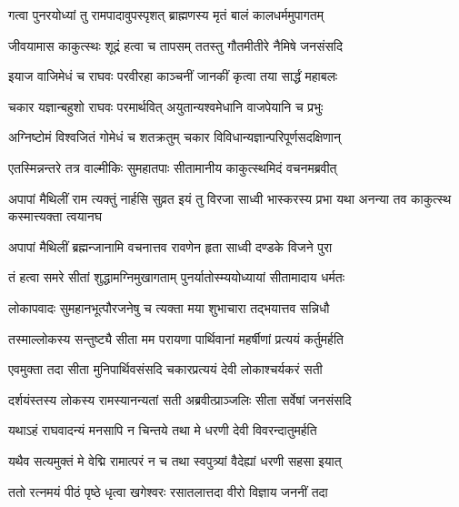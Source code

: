 \twolineshloka
{गत्वा पुनरयोध्यां तु रामपादावुपस्पृशत्}
{ब्राह्मणस्य मृतं बालं कालधर्ममुपागतम्}%

\twolineshloka
{जीवयामास काकुत्स्थः शूद्रं हत्वा च तापसम्}
{ततस्तु गौतमीतीरे नैमिषे जनसंसदि}%

\twolineshloka
{इयाज वाजिमेधं च राघवः परवीरहा}
{काञ्चनीं जानकीं कृत्वा तया सार्द्धं महाबलः}%

\twolineshloka
{चकार यज्ञान्बहुशो राघवः परमार्थवित्}
{अयुतान्यश्वमेधानि वाजपेयानि च प्रभुः}%

\twolineshloka
{अग्निष्टोमं विश्वजितं गोमेधं च शतक्रतुम्}
{चकार विविधान्यज्ञान्परिपूर्णसदक्षिणान्}%

\twolineshloka
{एतस्मिन्नन्तरे तत्र वाल्मीकिः सुमहातपाः}
{सीतामानीय काकुत्स्थमिदं वचनमब्रवीत्}%



\threelineshloka
{अपापां मैथिलीं राम त्यक्तुं नार्हसि सुव्रत}
{इयं तु विरजा साध्वी भास्करस्य प्रभा यथा}
{अनन्या तव काकुत्स्थ कस्मात्त्यक्ता त्वयानघ}%


\twolineshloka
{अपापां मैथिलीं ब्रह्मन्जानामि वचनात्तव}
{रावणेन हृता साध्वी दण्डके विजने पुरा}%

\twolineshloka
{तं हत्वा समरे सीतां शुद्धामग्निमुखागताम्}
{पुनर्यातोस्म्ययोध्यायां सीतामादाय धर्मतः}%

\twolineshloka
{लोकापवादः सुमहानभूत्पौरजनेषु च}
{त्यक्ता मया शुभाचारा तद्भयात्तव सन्निधौ}%

\twolineshloka
{तस्माल्लोकस्य सन्तुष्ट्यै सीता मम परायणा}
{पार्थिवानां महर्षीणां प्रत्ययं कर्तुमर्हति}%


\twolineshloka
{एवमुक्ता तदा सीता मुनिपार्थिवसंसदि}
{चकारप्रत्ययं देवी लोकाश्चर्यकरं सती}%

\twolineshloka
{दर्शयंस्तस्य लोकस्य रामस्यानन्यतां सती}
{अब्रवीत्प्राञ्जलिः सीता सर्वेषां जनसंसदि}%


\twolineshloka
{यथाऽहं राघवादन्यं मनसापि न चिन्तये}
{तथा मे धरणी देवी विवरन्दातुमर्हति}%

\twolineshloka
{यथैव सत्यमुक्तं मे वेद्मि रामात्परं न च}
{तथा स्वपुत्र्यां वैदेह्यां धरणी सहसा इयात्}%


\twolineshloka
{ततो रत्नमयं पीठं पृष्ठे धृत्वा खगेश्वरः}
{रसातलात्तदा वीरो विज्ञाय जननीं तदा}%

